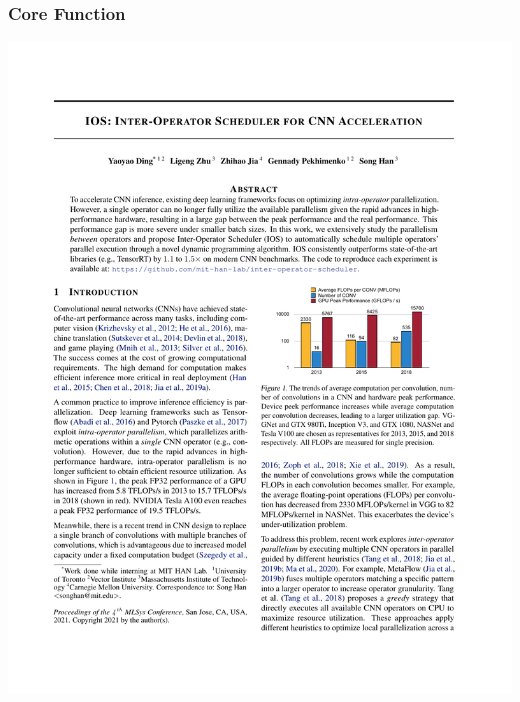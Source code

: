 \documentclass[12pt,aspectratio=169]{beamer}
\begin{document}
    \begin{frame}
        \frametitle{Core Function}

        \centering
        \includegraphics[page=5,trim=11.3cm 15.9cm 2.2cm 8.2cm,clip,scale=1]{paper.pdf}
    \end{frame}
\end{document}
